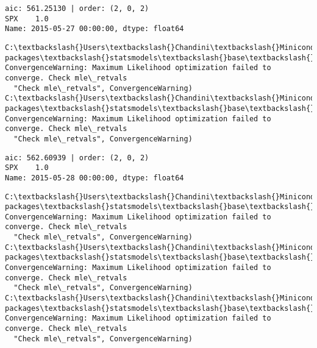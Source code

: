 \documentclass[11pt]{article}
\begin{document}
    \begin{Verbatim}[commandchars=\\\{\}]
aic: 561.25130 | order: (2, 0, 2)
SPX    1.0
Name: 2015-05-27 00:00:00, dtype: float64

    \end{Verbatim}

    \begin{Verbatim}[commandchars=\\\{\}]
C:\textbackslash{}Users\textbackslash{}Chandini\textbackslash{}Miniconda3\textbackslash{}envs\textbackslash{}auquan\textbackslash{}lib\textbackslash{}site-packages\textbackslash{}statsmodels\textbackslash{}base\textbackslash{}model.py:496: ConvergenceWarning: Maximum Likelihood optimization failed to converge. Check mle\_retvals
  "Check mle\_retvals", ConvergenceWarning)
C:\textbackslash{}Users\textbackslash{}Chandini\textbackslash{}Miniconda3\textbackslash{}envs\textbackslash{}auquan\textbackslash{}lib\textbackslash{}site-packages\textbackslash{}statsmodels\textbackslash{}base\textbackslash{}model.py:496: ConvergenceWarning: Maximum Likelihood optimization failed to converge. Check mle\_retvals
  "Check mle\_retvals", ConvergenceWarning)

    \end{Verbatim}

    \begin{Verbatim}[commandchars=\\\{\}]
aic: 562.60939 | order: (2, 0, 2)
SPX    1.0
Name: 2015-05-28 00:00:00, dtype: float64

    \end{Verbatim}

    \begin{Verbatim}[commandchars=\\\{\}]
C:\textbackslash{}Users\textbackslash{}Chandini\textbackslash{}Miniconda3\textbackslash{}envs\textbackslash{}auquan\textbackslash{}lib\textbackslash{}site-packages\textbackslash{}statsmodels\textbackslash{}base\textbackslash{}model.py:496: ConvergenceWarning: Maximum Likelihood optimization failed to converge. Check mle\_retvals
  "Check mle\_retvals", ConvergenceWarning)
C:\textbackslash{}Users\textbackslash{}Chandini\textbackslash{}Miniconda3\textbackslash{}envs\textbackslash{}auquan\textbackslash{}lib\textbackslash{}site-packages\textbackslash{}statsmodels\textbackslash{}base\textbackslash{}model.py:496: ConvergenceWarning: Maximum Likelihood optimization failed to converge. Check mle\_retvals
  "Check mle\_retvals", ConvergenceWarning)
C:\textbackslash{}Users\textbackslash{}Chandini\textbackslash{}Miniconda3\textbackslash{}envs\textbackslash{}auquan\textbackslash{}lib\textbackslash{}site-packages\textbackslash{}statsmodels\textbackslash{}base\textbackslash{}model.py:496: ConvergenceWarning: Maximum Likelihood optimization failed to converge. Check mle\_retvals
  "Check mle\_retvals", ConvergenceWarning)

    \end{Verbatim}
\end{document}
